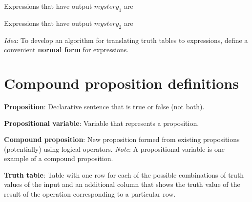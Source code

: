 \documentclass[12pt, oneside]{article}
\begin{document}
Expressions that have output $mystery_1$ are

\vspace{100pt}

Expressions that have output $mystery_2$ are

\vspace{100pt}

{\it Idea}: To develop an algorithm for translating truth tables to expressions, 
define a convenient {\bf normal form} for expressions. \vfill
\section*{Compound proposition definitions}


{\bf Proposition}: Declarative sentence that is true or false (not both).

{\bf Propositional variable}: Variable that represents a proposition.

{\bf Compound proposition}: New proposition formed from existing propositions (potentially) using logical operators.
{\it Note}: A propositional variable is one example of a compound proposition.

{\bf Truth table}: Table with one row for each of the possible combinations of truth values of the input and 
    an additional column that shows the truth value of the result of the operation corresponding to a particular row.
    
 \vfill
\end{document}
